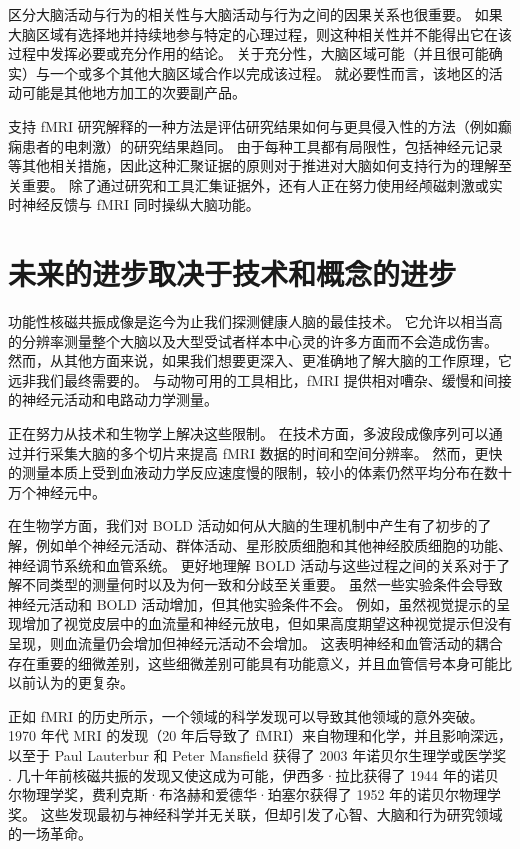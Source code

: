 区分大脑活动与行为的相关性与大脑活动与行为之间的因果关系也很重要。 如果大脑区域有选择地并持续地参与特定的心理过程，则这种相关性并不能得出它在该过程中发挥必要或充分作用的结论。 关于充分性，大脑区域可能（并且很可能确实）与一个或多个其他大脑区域合作以完成该过程。 就必要性而言，该地区的活动可能是其他地方加工的次要副产品。

支持 fMRI 研究解释的一种方法是评估研究结果如何与更具侵入性的方法（例如癫痫患者的电刺激）的研究结果趋同。 由于每种工具都有局限性，包括神经元记录等其他相关措施，因此这种汇聚证据的原则对于推进对大脑如何支持行为的理解至关重要。 除了通过研究和工具汇集证据外，还有人正在努力使用经颅磁刺激或实时神经反馈与 fMRI 同时操纵大脑功能。




\section{未来的进步取决于技术和概念的进步}

功能性核磁共振成像是迄今为止我们探测健康人脑的最佳技术。 它允许以相当高的分辨率测量整个大脑以及大型受试者样本中心灵的许多方面而不会造成伤害。 然而，从其他方面来说，如果我们想要更深入、更准确地了解大脑的工作原理，它远非我们最终需要的。 与动物可用的工具相比，fMRI 提供相对嘈杂、缓慢和间接的神经元活动和电路动力学测量。

正在努力从技术和生物学上解决这些限制。 在技术方面，多波段成像序列可以通过并行采集大脑的多个切片来提高 fMRI 数据的时间和空间分辨率。 然而，更快的测量本质上受到血液动力学反应速度慢的限制，较小的体素仍然平均分布在数十万个神经元中。

在生物学方面，我们对 BOLD 活动如何从大脑的生理机制中产生有了初步的了解，例如单个神经元活动、群体活动、星形胶质细胞和其他神经胶质细胞的功能、神经调节系统和血管系统。 更好地理解 BOLD 活动与这些过程之间的关系对于了解不同类型的测量何时以及为何一致和分歧至关重要。 虽然一些实验条件会导致神经元活动和 BOLD 活动增加，但其他实验条件不会。 例如，虽然视觉提示的呈现增加了视觉皮层中的血流量和神经元放电，但如果高度期望这种视觉提示但没有呈现，则血流量仍会增加但神经元活动不会增加。 这表明神经和血管活动的耦合存在重要的细微差别，这些细微差别可能具有功能意义，并且血管信号本身可能比以前认为的更复杂。

正如 fMRI 的历史所示，一个领域的科学发现可以导致其他领域的意外突破。 1970 年代 MRI 的发现（20 年后导致了 fMRI）来自物理和化学，并且影响深远，以至于 Paul Lauterbur 和 Peter Mansfield 获得了 2003 年诺贝尔生理学或医学奖 . 几十年前核磁共振的发现又使这成为可能，伊西多·拉比获得了 1944 年的诺贝尔物理学奖，费利克斯·布洛赫和爱德华·珀塞尔获得了 1952 年的诺贝尔物理学奖。 这些发现最初与神经科学并无关联，但却引发了心智、大脑和行为研究领域的一场革命。


